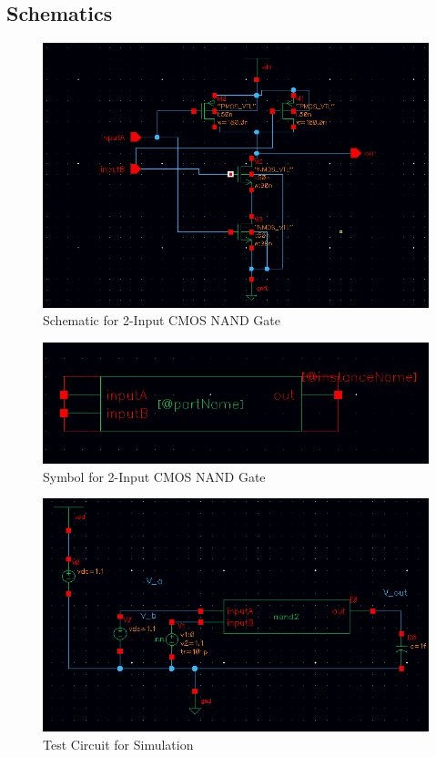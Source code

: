 \documentclass[12pt]{article}
\begin{document}
\subsection{Schematics}
\begin{figure}[H]
\centering
\includegraphics[width=\linewidth]{schematic}
\caption{Schematic for 2-Input CMOS NAND Gate}
\label{fig:schematic}
\end{figure}

\begin{figure}[H]
\centering
\includegraphics[width=\linewidth]{symbol}
\caption{Symbol for 2-Input CMOS NAND Gate}
\label{fig:symbol}
\end{figure}

\begin{figure}[H]
\centering
\includegraphics[width=1\linewidth]{test-circuit}
\caption{Test Circuit for Simulation}
\label{fig:test-circuit}
\end{figure}
\end{document}
